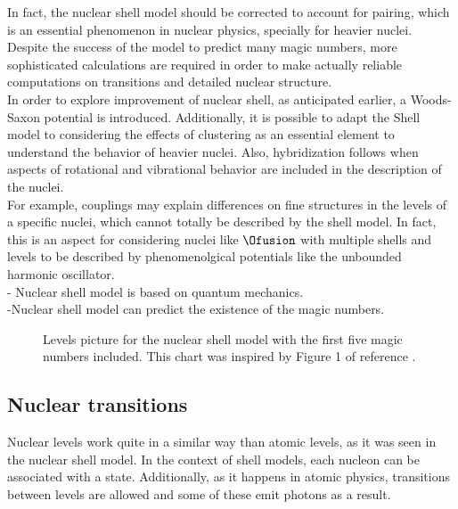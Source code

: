 \documentclass[openany]{book}
\begin{document}
In fact, the nuclear shell model should be corrected to account for pairing, which is an essential phenomenon in nuclear physics, specially for heavier nuclei. Despite the success of the model to predict many magic numbers, more sophisticated calculations are required in order to make actually reliable computations on transitions and detailed nuclear structure. \\

In order to explore improvement of nuclear shell, as anticipated earlier, a Woods-Saxon potential is introduced. Additionally, it is possible to adapt the Shell model to considering the effects of clustering as an essential element to understand the behavior of heavier nuclei. Also, hybridization follows when aspects of rotational and vibrational behavior are included in the description of the nuclei.  \\

For example, couplings may explain differences on fine structures in the levels of a specific nuclei, which cannot totally be described by the shell model. In fact, this is an aspect for considering nuclei like $\Ofusion$ with multiple shells and levels to be described by phenomenolgical potentials like the unbounded harmonic oscillator. \\

- Nuclear shell model is based on quantum mechanics. \\

-Nuclear shell model can predict the existence of the magic numbers.

\begin{figure}[H]
	
	\caption[Nuclear shell model levels picture]{Levels picture for the nuclear shell model with the first five magic numbers included. This chart was inspired by Figure 1 of reference \cite{tran_ong_hagen_morris_aoi_suzuki_kanada-enyo_geng_terashima_tanihata_2018}. }
	\label{fig:nuclerShellModelLevels}
\end{figure}


\subsection{Nuclear transitions}  \label{sub:nuclearTransitions}

Nuclear levels work quite in a similar way than atomic levels, as it was seen in the nuclear shell model. In the context of shell models, each nucleon can be associated with a state.  Additionally, as it happens in atomic physics, transitions between levels are allowed and some of these emit photons as a result. \\
\end{document}
